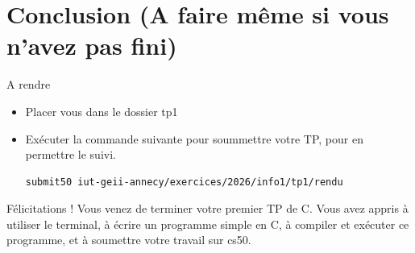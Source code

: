 \section{Conclusion (A faire même si vous n'avez pas fini)}

\begin{UPSTIManipulation}{A rendre}
	\begin{itemize}
		\item[$\Box$] Placer vous dans le dossier tp1
		\item[$\Box$] Exécuter la commande suivante pour soummettre votre TP, pour en permettre le suivi.
		      \begin{lstlisting}[language=bash,style=console]
submit50 iut-geii-annecy/exercices/2026/info1/tp1/rendu
\end{lstlisting}
	\end{itemize}
\end{UPSTIManipulation}


\begin{UPSTIinfor}{Félicitations !}
	Vous venez de terminer votre premier TP de C. Vous avez appris à utiliser le terminal, à écrire un programme simple en C, à compiler et exécuter ce programme, et à soumettre votre travail sur cs50.
\end{UPSTIinfor}